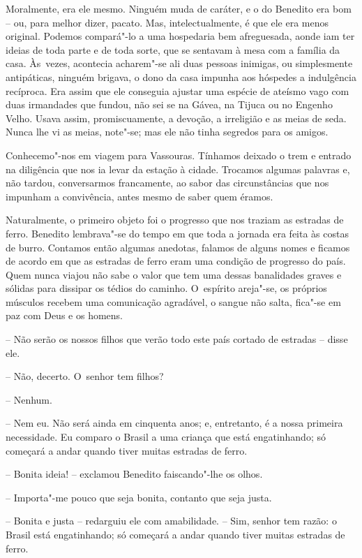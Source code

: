 Moralmente, era ele mesmo. Ninguém muda de caráter, e o do Benedito era
bom -- ou, para melhor dizer, pacato. Mas, intelectualmente, é que ele
era menos original. Podemos compará"-lo a uma hospedaria bem afreguesada,
aonde iam ter ideias de toda parte e de toda sorte, que se sentavam à
mesa com a família da casa. Às~vezes, acontecia acharem"-se ali duas
pessoas inimigas, ou simplesmente antipáticas, ninguém brigava, o dono
da casa impunha aos hóspedes a indulgência recíproca. Era assim que ele
conseguia ajustar uma espécie de ateísmo vago com duas irmandades que
fundou, não sei se na Gávea, na Tijuca ou no Engenho Velho. Usava assim,
promiscuamente, a devoção, a irreligião e as meias de seda. Nunca lhe vi
as meias, note"-se; mas ele não tinha segredos para os amigos.

Conhecemo"-nos em viagem para Vassouras. Tínhamos deixado o trem e
entrado na diligência que nos ia levar da estação à cidade. Trocamos
algumas palavras e, não tardou, conversarmos francamente, ao sabor das
circunstâncias que nos impunham a convivência, antes mesmo de saber quem
éramos.

Naturalmente, o primeiro objeto foi o progresso que nos traziam as
estradas de ferro. Benedito lembrava"-se do tempo em que toda a jornada
era feita às costas de burro. Contamos então algumas anedotas, falamos
de alguns nomes e ficamos de acordo em que as estradas de ferro eram uma
condição de progresso do país. Quem nunca viajou não sabe o valor que
tem uma dessas banalidades graves e sólidas para dissipar os tédios do
caminho. O~espírito areja"-se, os próprios músculos recebem uma
comunicação agradável, o sangue não salta, fica"-se em paz com Deus e os
homens.

-- Não serão os nossos filhos que verão todo este país cortado de
estradas -- disse ele.

-- Não, decerto. O~senhor tem filhos?

-- Nenhum.

-- Nem eu. Não será ainda em cinquenta anos; e, entretanto, é a nossa
primeira necessidade. Eu comparo o Brasil a uma criança que está
engatinhando; só começará a andar quando tiver muitas estradas de ferro.

-- Bonita ideia! -- exclamou Benedito faiscando"-lhe os olhos.

-- Importa"-me pouco que seja bonita, contanto que seja justa.

-- Bonita e justa -- redarguiu ele com amabilidade. -- Sim, senhor tem
razão: o Brasil está engatinhando; só começará a andar quando tiver
muitas estradas de ferro.

